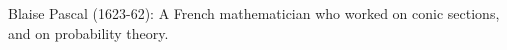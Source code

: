 Blaise Pascal (1623-62): A French mathematician who worked on conic sections,
and on probability theory.